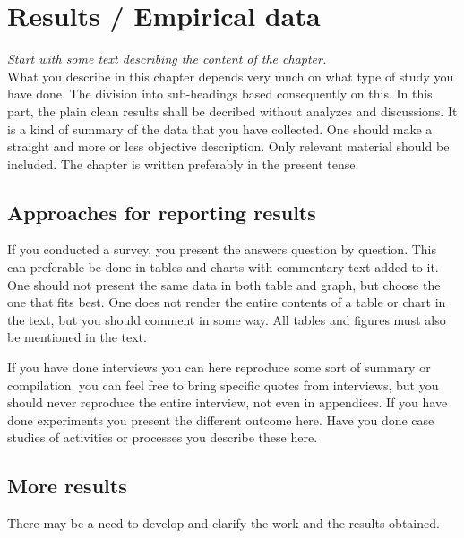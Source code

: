 \chapter{Results / Empirical data}
\emph{Start with some text describing the content of the chapter.}\\

\noindent What you describe in this chapter depends very much on what type of study you have done. The division into sub-headings based consequently on this. In this part, the plain clean results shall be decribed without analyzes and discussions. It is a kind of summary of the data that you have collected. One should make a straight and more or less objective description. Only relevant material should be included. The chapter is written preferably in the present tense.
		
\section{Approaches for reporting results}
If you conducted a survey, you present the answers question by question. This can preferable be done in tables and charts with commentary text added to it. One should not present the same data in both table and graph, but choose the one that fits best. One does not render the entire contents of a table or chart in the text, but you should comment in some way. All tables and figures must also be mentioned in the text.

If you have done interviews you can here reproduce some sort of summary or compilation. you can feel free to bring specific quotes from interviews, but you should never reproduce the entire interview, not even in appendices. If you have done experiments you present the different outcome here. Have you done case studies of activities or processes you describe these here.

\section{More results}	
There may be a need to develop and clarify the work and the results obtained.
